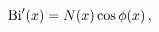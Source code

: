 \[\mathop{\mathrm{Bi}\/}\nolimits'\!\left(x\right)=\mathop{N\/}\nolimits\!\left(%
x\right)\mathop{\cos\/}\nolimits\mathop{\phi\/}\nolimits\!\left(x\right),\]